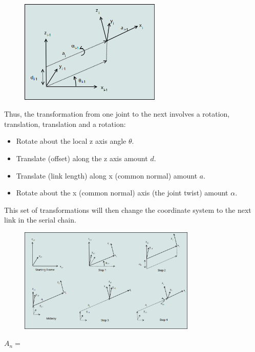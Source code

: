 \begin{figure}
\centering
\includegraphics[width=0.6\textwidth,height=\textheight]{TermsFigures/DH2.png}
\caption{}
\end{figure}

Thus, the transformation from one joint to the next involves a rotation,
translation, translation and a rotation:

\begin{itemize}
\tightlist
\item
  Rotate about the local z axis angle \(\theta\).
\item
  Translate (offset) along the z axis amount \(d\).
\item
  Translate (link length) along x (common normal) amount \(a\).
\item
  Rotate about the x (common normal) axis (the joint twist) amount
  \(\alpha\).
\end{itemize}

This set of transformations will then change the coordinate system to
the next link in the serial chain.

\begin{figure}
\centering
\includegraphics[width=0.75\textwidth,height=\textheight]{TermsFigures/DH3.png}
\caption{}
\end{figure}

\(A_{n} =\)

